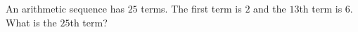 An arithmetic sequence has $25$ terms. The first term is $2$ and the $13$th term is $6$. What is the $25$th term?

